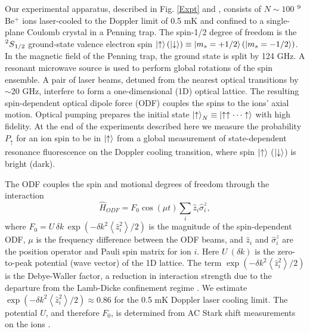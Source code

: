 \documentclass[aps,prl,twocolumn,superscriptaddress,floatfix]{revtex4-1}
\begin{document}
Our experimental apparatus, described in Fig. \ref{Expt} and \citep{Sawyer2014,Bohnet2015}, consists of $N\sim100$ $\prescript{9}{}{}$Be$^{+}$ ions laser-cooled to the Doppler limit of 0.5 mK and confined to a single-plane Coulomb crystal in a Penning trap. The spin-1/2 degree of freedom is the $\prescript{2}{}{S}_{1/2}$ ground-state valence electron spin $\ket{\uparrow} (\ket{\downarrow}) \equiv \ket{m_{s}=+1/2} (\ket{m_{s}=-1/2}) $. In the magnetic field of the Penning trap, the ground state is split by 124 GHz. A resonant microwave source is used to perform global rotations of the spin ensemble. A pair of laser beams, detuned from the nearest optical transitions by $\sim$20 GHz, interfere to form a one-dimensional (1D) optical lattice. The resulting spin-dependent optical dipole force (ODF) couples the spins to the ions' axial motion. Optical pumping prepares the initial state $\ket{\uparrow}_N \equiv \ket{\uparrow \uparrow \cdots \uparrow}$ with high fidelity. At the end of the experiments described here we measure the probability $P_\uparrow$ for an ion spin to be in $\ket{\uparrow}$ from a global measurement of state-dependent resonance fluorescence on the Doppler cooling transition, where spin $\ket{\uparrow}$ ($\ket{\downarrow}$) is bright (dark).

The ODF couples the spin and motional degrees of freedom through the interaction \citep{Bohnet2015}
\begin{equation}
\hat{H}_{ODF} = F_0\cos\left(\mu t \right)\sum_{i} \hat{z}_{i} \hat{\sigma}^{z}_{i},
\label{Hodf}
\end{equation}
where $F_0= U \, \delta k \, \exp(-\delta k^2 \left< \hat{z}^{2}_{i} \right> / 2)$ is the magnitude of the spin-dependent ODF, $\mu$ is the frequency difference between the ODF beams, and $\hat{z}_{i}$ and $\hat{\sigma}^{z}_{i}$ are the position operator and Pauli spin matrix for ion $i$. Here $U\:(\delta k)$ is the zero-to-peak potential (wave vector) of the 1D lattice. The term $\exp(-\delta k^2 \left< \hat{z}^{2}_{i} \right> / 2)$ is the Debye-Waller factor, a reduction in interaction strength due to the departure from the Lamb-Dicke confinement regime \citep{Wineland1998a}. We estimate $\exp(-\delta k^2 \left< \hat{z}^{2}_{i} \right> / 2) \approx 0.86 $ for the 0.5 mK Doppler laser cooling limit. The potential $U$, and therefore $F_0$, is determined from AC Stark shift measurements on the ions \citep{Britton2012}. 
\end{document}
